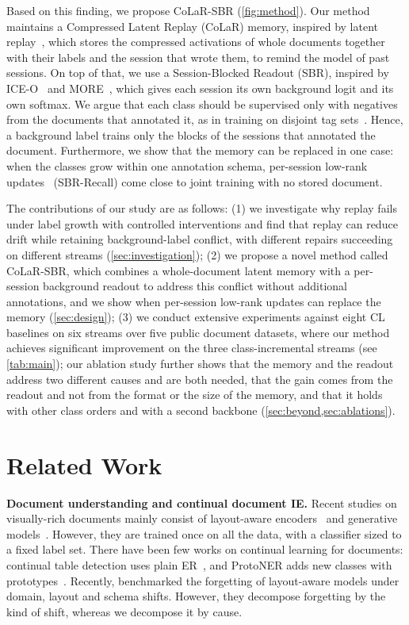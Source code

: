 \documentclass[10pt,twocolumn,letterpaper]{article}
\newcommand{\runin}[1]{\par\addvspace{0.7ex plus .3ex minus .1ex}\noindent\textbf{#1}\hspace{1em}\ignorespaces}
\begin{document}
Based on this finding, we propose CoLaR-SBR (\cref{fig:method}). Our method maintains a Compressed Latent Replay (CoLaR) memory, inspired by latent replay~\citep{hayes2020remind,pellegrini2020latent}, which stores the compressed activations of whole documents together with their labels and the session that wrote them, to remind the model of past sessions. On top of that, we use a Session-Blocked Readout (SBR), inspired by ICE-O~\citep{liu2023ice} and MORE~\citep{kim2022more}, which gives each session its own background logit and its own softmax. We argue that each class should be supervised only with negatives from the documents that annotated it, as in training on disjoint tag sets~\citep{greenberg2018marginal}. Hence, a background label trains only the blocks of the sessions that annotated the document. Furthermore, we show that the memory can be replaced in one case: when the classes grow within one annotation schema, per-session low-rank updates~\citep{hu2022lora} (SBR-Recall) come close to joint training with no stored document.

The contributions of our study are as follows: (1) we investigate why replay fails under label growth with controlled interventions and find that replay can reduce drift while retaining background-label conflict, with different repairs succeeding on different streams (\cref{sec:investigation}); (2) we propose a novel method called CoLaR-SBR, which combines a whole-document latent memory with a per-session background readout to address this conflict without additional annotations, and we show when per-session low-rank updates can replace the memory (\cref{sec:design}); (3) we conduct extensive experiments against eight CL baselines on six streams over five public document datasets, where our method achieves significant improvement on the three class-incremental streams (see \cref{tab:main}); our ablation study further shows that the memory and the readout address two different causes and are both needed, that the gain comes from the readout and not from the format or the size of the memory, and that it holds with other class orders and with a second backbone (\cref{sec:beyond,sec:ablations}).
\section{Related Work}
\label{sec:related}
\runin{Document understanding and continual document IE.} Recent studies on visually-rich documents mainly consist of layout-aware encoders~\citep{xu2020layoutlm,xu2021layoutlmv2,huang2022layoutlmv3,wang2022lilt,hong2022bros} and generative models~\citep{kim2022donut,tang2023udop}. However, they are trained once on all the data, with a classifier sized to a fixed label set. There have been few works on continual learning for documents: continual table detection uses plain ER~\citep{minouei2022table}, and ProtoNER adds new classes with prototypes~\citep{kumar2023protoner}. Recently, \citet{sassioui2026documents} benchmarked the forgetting of layout-aware models under domain, layout and schema shifts. However, they decompose forgetting by the kind of shift, whereas we decompose it by cause.
\end{document}
